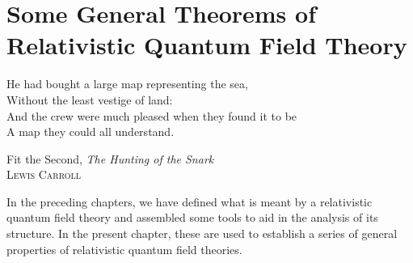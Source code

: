\section{Some General Theorems of Relativistic Quantum Field Theory}
\label{ch:general-theorems-relativistic-qft}

\begin{flushright}
\begin{minipage}{0.62\textwidth}
\small
He had bought a large map representing the sea,\\
Without the least vestige of land:\\
And the crew were much pleased when they found it to be\\
A map they could all understand.

\medskip
Fit the Second, \emph{The Hunting of the Snark}\\
\hfill\textsc{Lewis Carroll}
\end{minipage}
\end{flushright}

In the preceding chapters, we have defined what is meant by a relativistic
quantum field theory and assembled some tools to aid in the analysis of its
structure. In the present chapter, these are used to establish a series of
general properties of relativistic quantum field theories.
